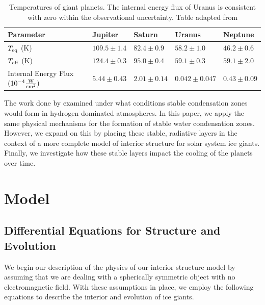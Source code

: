 \documentclass[11pt]{ucscthesisbs}
\begin{document}
\renewcommand{\arraystretch}{1.5}
\begin{table}[]
\centering
\begin{tabular}{lllll}
Parameter                                                               & Jupiter                              & Saturn                               & Uranus                                 & Neptune                              \\ \hline
\multicolumn{1}{|l|}{$T_{\rm eq}$ (K)}                                  & \multicolumn{1}{l|}{$109.5 \pm 1.4$} & \multicolumn{1}{l|}{$82.4 \pm 0.9$}  & \multicolumn{1}{l|}{$58.2 \pm 1.0$}    & \multicolumn{1}{l|}{$46.2 \pm 0.6$}  \\ \hline
\multicolumn{1}{|l|}{$T_{\rm eff}$ (K)}                                 & \multicolumn{1}{l|}{$124.4 \pm 0.3$} & \multicolumn{1}{l|}{$95.0 \pm 0.4$}  & \multicolumn{1}{l|}{$59.1 \pm 0.3$}    & \multicolumn{1}{l|}{$59.1 \pm 2.0$}  \\ \hline
\multicolumn{1}{|l|}{Internal Energy Flux $(10^{-4} \frac{\rm W}{\rm cm^{2}})$} & \multicolumn{1}{l|}{$5.44 \pm 0.43$} & \multicolumn{1}{l|}{$2.01 \pm 0.14$} & \multicolumn{1}{l|}{$0.042 \pm 0.047$} & \multicolumn{1}{l|}{$0.43 \pm 0.09$}  \\ \hline
\end{tabular}
\caption{Temperatures of giant planets. The internal energy flux of Uranus is consistent with zero within the observational uncertainty. Table adapted from \citep{pearl_conrath_1991}}
\label{tab:planetary_temperatures}
\end{table}
\renewcommand{\arraystretch}{1}

The work done by \citep{guillot_1995,friedson_2017,leconte_2017} examined under what conditions stable condensation zones would form in hydrogen dominated atmospheres. In this paper, we apply the same physical mechanisms for the formation of stable water condensation zones. However, we expand on this by placing these stable, radiative layers in the context of a more complete model of interior structure for solar system ice giants. Finally, we investigate how these stable layers impact the cooling of the planets over time. 


\chapter{Model}

\section{Differential Equations for Structure and Evolution}
\label{Three-layer Model with Dry Adiabat}
We begin our description of the physics of our interior structure model by assuming that we are dealing with a spherically symmetric object with no electromagnetic field.  With these assumptions in place, we employ the following equations to describe the interior and evolution of ice giants.
\end{document}
